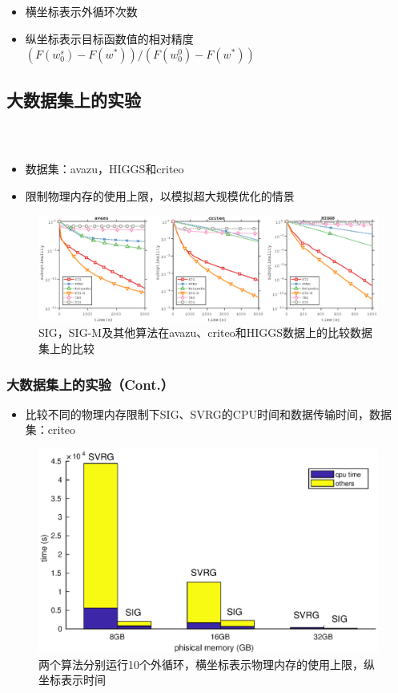 {    \begin{itemize}
        \item 横坐标表示外循环次数
        \item 纵坐标表示目标函数值的相对精度$(F(w_0^s) - F(w^*)) / (F(w_0^0) - F(w^*))$
    \end{itemize}

  }

  \subsection{大数据集上的实验}

  \frame
  {
    \frametitle{\subsecname~ }
    \footnotesize
    \begin{itemize}
        \item 数据集：avazu，HIGGS和criteo
        \item 限制物理内存的使用上限，以模拟超大规模优化的情景
    \end{itemize}

    \begin{figure}
        \includegraphics[trim={3.5cm 0cm 3.5cm 0cm},clip,width=11.5cm]{data/img/figure4}
        \caption{SIG，SIG-M及其他算法在avazu、criteo和HIGGS数据上的比较数据集上的比较}
    \end{figure}

  }

  \frame
  {
    \frametitle{大数据集上的实验（Cont.）}
    \footnotesize
    \begin{itemize}
        \item 比较不同的物理内存限制下SIG、SVRG的CPU时间和数据传输时间，数据集：criteo
    \end{itemize}

    \vspace*{-0.5cm}
    \begin{figure}
        \includegraphics[trim={0 0 0 0},clip,width=11.5cm]{data/img/bar_time}
        \caption{两个算法分别运行10个外循环，横坐标表示物理内存的使用上限，纵坐标表示时间}
    \end{figure}

  }

